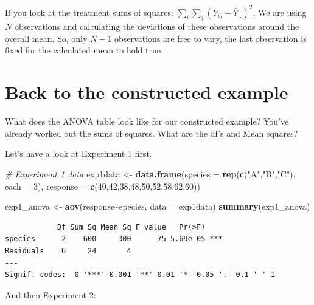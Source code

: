 \documentclass[
  letterpaper,
]{book}
\newenvironment{Shaded}{\begin{snugshade}}{\end{snugshade}}
\newcommand{\AttributeTok}[1]{\textcolor[rgb]{0.13,0.29,0.53}{#1}}
\newcommand{\CommentTok}[1]{\textcolor[rgb]{0.56,0.35,0.01}{\textit{#1}}}
\newcommand{\DecValTok}[1]{\textcolor[rgb]{0.00,0.00,0.81}{#1}}
\newcommand{\FunctionTok}[1]{\textcolor[rgb]{0.13,0.29,0.53}{\textbf{#1}}}
\newcommand{\NormalTok}[1]{#1}
\newcommand{\OtherTok}[1]{\textcolor[rgb]{0.56,0.35,0.01}{#1}}
\newcommand{\SpecialCharTok}[1]{\textcolor[rgb]{0.81,0.36,0.00}{\textbf{#1}}}
\newcommand{\StringTok}[1]{\textcolor[rgb]{0.31,0.60,0.02}{#1}}
\begin{document}
If you look at the treatment sums of squares:
\(\sum_i \sum_j (Y_{ij} - \bar{Y}_{..})^2\). We are using \(N\)
observations and calculating the deviations of these observations around
the overall mean. So, only \(N-1\) observations are free to vary, the
last observation is fixed for the calculated mean to hold true.

\section{Back to the constructed
example}\label{back-to-the-constructed-example}

What does the ANOVA table look like for our constructed example? You've
already worked out the sums of squares. What are the df's and Mean
squares?

Let's have a look at Experiment 1 first.

\begin{Shaded}
\begin{Highlighting}[]
\CommentTok{\# Experiment 1 data }
\NormalTok{exp1data }\OtherTok{\textless{}{-}} \FunctionTok{data.frame}\NormalTok{(}\AttributeTok{species =} \FunctionTok{rep}\NormalTok{(}\FunctionTok{c}\NormalTok{(}\StringTok{"A"}\NormalTok{,}\StringTok{"B"}\NormalTok{,}\StringTok{"C"}\NormalTok{), }\AttributeTok{each =} \DecValTok{3}\NormalTok{),}
                       \AttributeTok{response =} \FunctionTok{c}\NormalTok{(}\DecValTok{40}\NormalTok{,}\DecValTok{42}\NormalTok{,}\DecValTok{38}\NormalTok{,}\DecValTok{48}\NormalTok{,}\DecValTok{50}\NormalTok{,}\DecValTok{52}\NormalTok{,}\DecValTok{58}\NormalTok{,}\DecValTok{62}\NormalTok{,}\DecValTok{60}\NormalTok{))}

\NormalTok{exp1\_anova }\OtherTok{\textless{}{-}} \FunctionTok{aov}\NormalTok{(response}\SpecialCharTok{\textasciitilde{}}\NormalTok{species, }\AttributeTok{data =}\NormalTok{ exp1data)}
\FunctionTok{summary}\NormalTok{(exp1\_anova)}
\end{Highlighting}
\end{Shaded}

\begin{verbatim}
            Df Sum Sq Mean Sq F value   Pr(>F)    
species      2    600     300      75 5.69e-05 ***
Residuals    6     24       4                     
---
Signif. codes:  0 '***' 0.001 '**' 0.01 '*' 0.05 '.' 0.1 ' ' 1
\end{verbatim}

And then Experiment 2:
\end{document}
